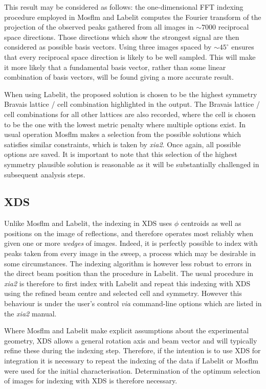 \documentclass[preprint,pdf]{iucr}
\begin{document}
This result may be considered as follows: the one-dimensional FFT
indexing procedure employed in Mosflm and Labelit computes the
Fourier transform of the projection of the observed peaks gathered
from all images in $\sim
7000$ reciprocal space directions. Those directions which show the
strongest signal are then considered as possible basis vectors. Using
three images spaced by $\sim 45^{\circ}$ ensures that every reciprocal
space direction is likely to be well sampled. This will make it more likely
that a fundamental basis vector, rather than some linear combination
of basis vectors, will be found giving a more accurate result.

When using Labelit, the proposed solution is chosen to be the highest symmetry
Bravais lattice / cell combination highlighted in the output. The
Bravais lattice / cell combinations for all other lattices are also
recorded, where the cell is chosen to be the one with the lowest
metric penalty where multiple options exist. In usual operation Mosflm
makes a selection from the possible solutions which satisfies similar
constraints, which is taken by \emph{xia2}. Once again, all possible
options are saved. It is important to note that this selection of the
highest symmetry plausible solution is reasonable as it will be
substantially challenged in subsequent analysis steps.

\subsection{XDS}

Unlike Mosflm and Labelit, the indexing in XDS uses $\phi$
centroids as well as positions on the image of reflections, and
therefore operates most reliably when given one or more \emph{wedges} of
images. Indeed, it is perfectly possible to index with peaks taken
from every image in the sweep, a process which may be desirable in some
circumstances. The indexing algorithm is however less robust to
errors in the direct beam position than the procedure in
Labelit. The usual procedure in \emph{xia2} is therefore to first
index with Labelit and repeat this indexing with XDS
using the refined beam centre and selected cell and symmetry. However
this behaviour is under the user's control \emph{via} command-line
options which are listed in the \emph{xia2} manual.

Where Mosflm and Labelit make explicit assumptions about the experimental
geometry, XDS allows a general rotation axis and beam vector and will
typically refine these during the indexing step. Therefore, if the
intention is to use XDS for integration it is necessary to
repeat the indexing of the data if Labelit or Mosflm were used for the
initial characterisation. Determination of the optimum
selection of images for indexing with XDS is therefore necessary.
\end{document}
